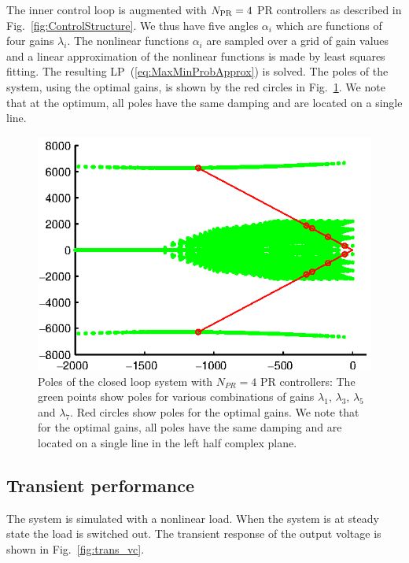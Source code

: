 \documentclass[conference,10pt]{IEEEtran}
\begin{document}
The inner control loop is augmented with $N_{\rm PR} = 4$ PR controllers as described in Fig.~\ref{fig:ControlStructure}. We thus have five
angles $\alpha_i$ which are functions of four gains
$\lambda_i$. The nonlinear functions $\alpha_i$ are sampled over a grid of gain values and a linear approximation of the nonlinear functions is made by least squares fitting. The resulting LP~(\ref{eq:MaxMinProbApprox}) is solved. The poles of the system, using the optimal gains, is shown by the red circles in Fig.~\ref{fig:PolesOptimalExample}.
We note that at the optimum, all poles have the same damping and are located on a single line. %
\begin{figure}[!h]
\centering

\includegraphics{fig/root_locus}
\caption{Poles of the closed loop system with $N_{PR}=4$ PR controllers: The green points show poles for various combinations of gains $\lambda_1$, $\lambda_3$, $\lambda_5$ and $\lambda_7$. Red circles show poles for the optimal gains. 
We note that for the optimal gains, all poles have the same damping and are located on a single line in the left half complex plane. 
}
\label{fig:PolesOptimalExample}
\end{figure}


\subsection{Transient performance}
The system is simulated with a nonlinear load. When the system is at steady state the load is switched out.
The transient response of the output voltage is shown in 
Fig.~\ref{fig:trans_vc}.
\end{document}
